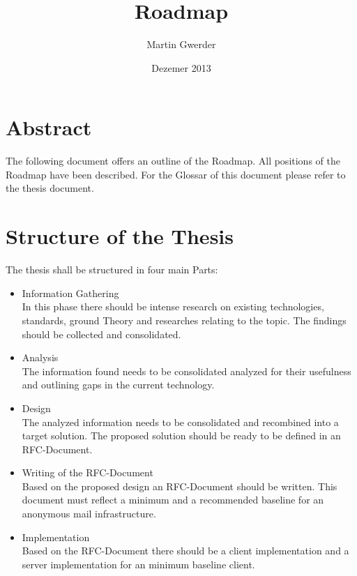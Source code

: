 \documentclass[11pt,a4paper]{article}
\begin{document}
\title{Roadmap}
\author{Martin Gwerder}
\date{Dezemer 2013}
\maketitle

\section{Abstract}
The following document offers an outline of the Roadmap. All positions of the Roadmap have been described. For the Glossar of this document please refer to the thesis document.

\section{Structure of the Thesis}
The thesis shall be structured in four main Parts:

\begin{itemize}
	\item Information Gathering\\
	      In this phase there should be intense research on existing technologies, standards, ground Theory and researches relating to the topic. The findings should be collected and consolidated.
	\item Analysis\\
				The information found needs to be consolidated analyzed for their usefulness and outlining gaps in the current technology.
	\item Design\\
				The analyzed information needs to be consolidated and recombined into a target solution. The proposed solution should be ready to be defined in an RFC-Document.
	\item Writing of the RFC-Document\\
				Based on the proposed design an RFC-Document should be written. This document must reflect a minimum and a recommended baseline for an anonymous mail infrastructure.
	\item Implementation\\
				Based on the RFC-Document there should be a client implementation and a server implementation for an minimum baseline client.
\end{itemize}
\end{document}
